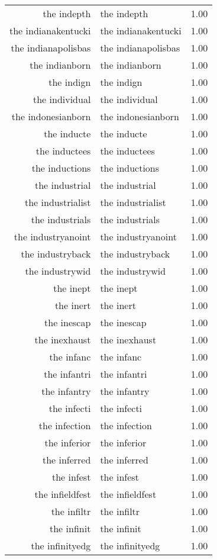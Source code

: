 \begin{table}[ht]
\begin{tabular}{rlr}
  the indepth & the indepth & 1.00 \\ 
  the indianakentucki & the indianakentucki & 1.00 \\ 
  the indianapolisbas & the indianapolisbas & 1.00 \\ 
  the indianborn & the indianborn & 1.00 \\ 
  the indign & the indign & 1.00 \\ 
  the individual & the individual & 1.00 \\ 
  the indonesianborn & the indonesianborn & 1.00 \\ 
  the inducte & the inducte & 1.00 \\ 
  the inductees & the inductees & 1.00 \\ 
  the inductions & the inductions & 1.00 \\ 
  the industrial & the industrial & 1.00 \\ 
  the industrialist & the industrialist & 1.00 \\ 
  the industrials & the industrials & 1.00 \\ 
  the industryanoint & the industryanoint & 1.00 \\ 
  the industryback & the industryback & 1.00 \\ 
  the industrywid & the industrywid & 1.00 \\ 
  the inept & the inept & 1.00 \\ 
  the inert & the inert & 1.00 \\ 
  the inescap & the inescap & 1.00 \\ 
  the inexhaust & the inexhaust & 1.00 \\ 
  the infanc & the infanc & 1.00 \\ 
  the infantri & the infantri & 1.00 \\ 
  the infantry & the infantry & 1.00 \\ 
  the infecti & the infecti & 1.00 \\ 
  the infection & the infection & 1.00 \\ 
  the inferior & the inferior & 1.00 \\ 
  the inferred & the inferred & 1.00 \\ 
  the infest & the infest & 1.00 \\ 
  the infieldfest & the infieldfest & 1.00 \\ 
  the infiltr & the infiltr & 1.00 \\ 
  the infinit & the infinit & 1.00 \\ 
  the infinityedg & the infinityedg & 1.00 \\ 

\end{tabular}
\end{table}
